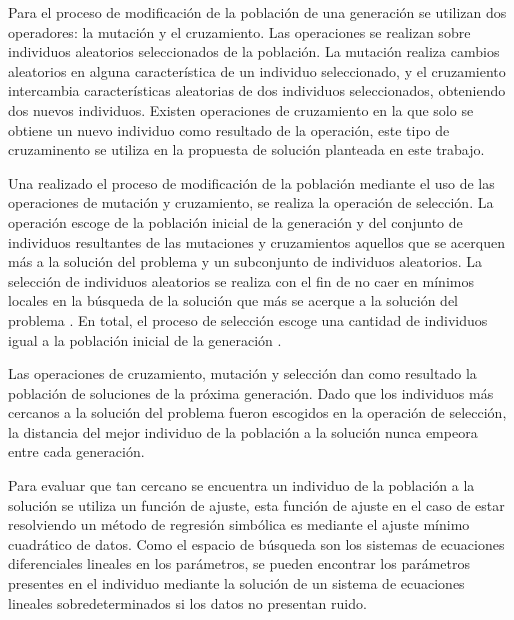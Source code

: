 Para el proceso de modificación de la población de una generación se utilizan dos operadores: la mutación y el cruzamiento. Las operaciones se realizan sobre individuos aleatorios seleccionados de la población. La mutación realiza cambios aleatorios en alguna característica de un individuo seleccionado, y el cruzamiento intercambia características aleatorias de dos individuos seleccionados, obteniendo dos nuevos individuos. Existen operaciones de cruzamiento en la que solo se obtiene un nuevo individuo como resultado de la operación, este tipo de cruzaminento se utiliza en la propuesta de solución planteada en este trabajo.

Una realizado el proceso de modificación de la población mediante el uso de las operaciones de mutación y cruzamiento, se realiza la operación de selección. La operación escoge de la población inicial de la generación y del conjunto de individuos resultantes de las mutaciones y cruzamientos aquellos que se acerquen más a la solución del problema y un subconjunto de individuos aleatorios. La selección de individuos aleatorios se realiza con el fin de no caer en mínimos locales en la búsqueda de la solución que más se acerque a la solución del problema \cite{mitchell1998introduction}. En total, el proceso de selección escoge una cantidad de individuos igual a la población inicial de la generación \cite{mitchell1998introduction}.

Las operaciones de cruzamiento, mutación y selección dan como resultado la población de soluciones de la próxima generación. Dado que los individuos más cercanos a la solución del problema fueron escogidos en la operación de selección, la distancia del mejor individuo de la población a la solución nunca empeora entre cada generación.


Para evaluar que tan cercano se encuentra un individuo de la población a la solución se utiliza un función de ajuste, esta función de ajuste en el caso de estar resolviendo un método de regresión simbólica es mediante el ajuste mínimo cuadrático de datos. Como el espacio de búsqueda son los sistemas de ecuaciones diferenciales lineales en los parámetros, se pueden encontrar los parámetros presentes en el individuo mediante la solución de un sistema de ecuaciones lineales sobredeterminados si los datos no presentan ruido.

